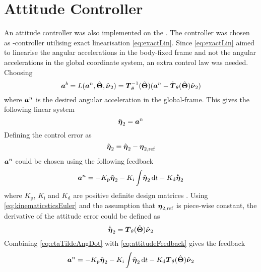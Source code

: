 \section{Attitude Controller}   
An attitude controller was also implemented on the \abbrROV. The controller was chosen as \abbrPID-controller utilising exact linearisation \eqref{eq:exactLin}.
Since \eqref{eq:exactLin} aimed to linearise the angular accelerations in the body-fixed frame and not the angular accelerations in the global coordinate system, an extra control law was needed.
Choosing 
\begin{equation}\label{eq:anLaw}
\accVector^b =L(\accVector^n,\hat{\eulerAngles},\hat{\nuVector}_2)=\boldsymbol{T}^{-1}_\theta(\hat{\eulerAngles})(\accVector^n - \dot{\boldsymbol{T}}_\theta(\hat{\eulerAngles})\hat{\nuVector}_2)\\
\end{equation} where $\accVector^n$ is the desired angular acceleration in the global-frame. This gives the following linear system \begin{equation}
\ddot{\boldsymbol{\eta}}_2=\accVector^n 
\end{equation}
Defining the control error as
\begin{equation}
\etaTildeAng = \hat{\etaVector}_2 - \etaVectorAng[,{\text{ref}}] 
\end{equation}
$\accVector^n$ could be chosen using the following feedback 
\begin{equation}\label{eq:attitudeFeedback}
\accVector^n=-K_{\text{p}} \etaTildeAng - K_{\text{i}}\int \! \etaTildeAng \, \mathrm{d}t - K_{\text{d}} \etaTildeAngdot
\end{equation}
where $K_{\text{p}}$, $K_{\text{i}}$ and $K_{\text{d}}$ are positive definite design matrices \citep[p. 453]{fossen2011}. 
Using \eqref{eq:kinematicsticsEuler} and the assumption that $\etaVectorAng[,{\text{ref}}]$ is piece-wise constant, the derivative of the attitude error could be defined as 
\begin{equation}\label{eq:etaTildeAngDot}
\etaTildeAngdot = \boldsymbol{T}_\theta(\hat{\boldsymbol{\Theta}})\hat{\nuVector}_{2}
\end{equation}
Combining \eqref{eq:etaTildeAngDot} with \eqref{eq:attitudeFeedback} gives the feedback
\begin{equation}
\accVector^n=-K_{\text{p}} \etaTildeAng - K_{\text{i}}\int \! \etaTildeAng \, \mathrm{d}t - K_{\text{d}} \boldsymbol{T}_\theta(\hat{\boldsymbol{\Theta}})\hat{\nuVector}_{2}
\end{equation}

